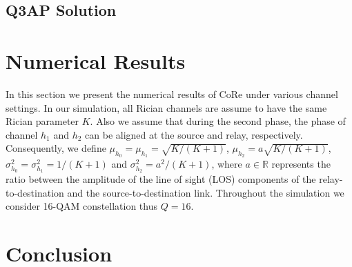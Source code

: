 \documentclass[conference]{IEEEtran}
\begin{document}
\subsection{Q3AP Solution}

\section{Numerical Results}
\label{sec:simulation}
In this section we present the numerical results of CoRe under various channel
settings. In our simulation, all Rician channels are assume to have the same Rician parameter 
$K$. Also we assume that during the second phase, the phase of channel $h_1$ and $h_2$ can be 
aligned at the source and relay, respectively. Consequently, we define $\mu_{h_0} = \mu_{h_1} = \sqrt{K/(K + 1)}$, $\mu_{h_2}=a\sqrt{K/(K + 1)}$,  $\sigma_{h_0}^2 = \sigma_{h_1}^2 = 1/(K+1)$ and $\sigma_{h_2}^2 = a^2/(K+1)$, where $a\in \mathbb{R}$ represents the ratio between the amplitude of the line of sight (LOS) components of the relay-to-destination and the source-to-destination link. Throughout the simulation we consider 16-QAM constellation thus $Q=16$.





\section{Conclusion}
\label{sec:conclusion}











\end{document}
